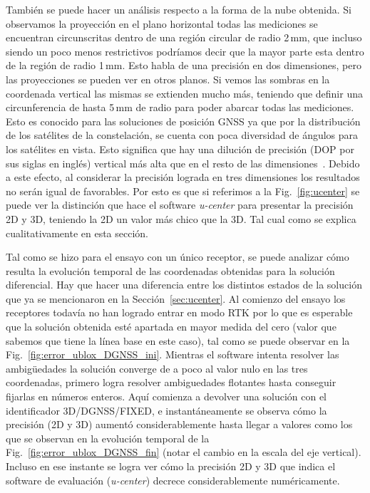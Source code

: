 \documentclass[a4paper,12pt,oneside,onecolumn,final,openright]{book}%
\begin{document}
	También se puede hacer un análisis respecto a la forma de la nube obtenida. Si observamos la proyección en el plano horizontal todas las mediciones se encuentran circunscritas dentro de una región circular de radio 2\,mm, que incluso siendo un poco menos restrictivos podríamos decir que la mayor parte esta dentro de la región de radio 1\,mm. Esto habla de una precisión en dos dimensiones, pero las proyecciones se pueden ver en otros planos. Si vemos las sombras en la coordenada vertical las mismas se extienden mucho más, teniendo que definir una circunferencia de hasta 5\,mm de radio para poder abarcar todas las mediciones. Esto es conocido para las soluciones de posición GNSS ya que por la distribución de los satélites de la constelación, se cuenta con poca diversidad de ángulos para los satélites en vista. Esto significa que hay una dilución de precisión (DOP por sus siglas en inglés) vertical más alta que en el resto de las dimensiones~\cite{kaplan}. Debido a este efecto, al considerar la precisión lograda en tres dimensiones los resultados no serán igual de favorables. Por esto es que si referimos a la Fig.~\ref{fig:ucenter} se puede ver la distinción que hace el software \textit{u-center} para presentar la precisión 2D y 3D, teniendo la 2D un valor más chico que la 3D. Tal cual como se explica cualitativamente en esta sección.

	Tal como se hizo para el ensayo con un único receptor, se puede analizar cómo resulta la evolución temporal de las coordenadas obtenidas para la solución diferencial. Hay que hacer una diferencia entre los distintos estados de la solución que ya se mencionaron en la Sección~\ref{sec:ucenter}. Al comienzo del ensayo los receptores todavía no han logrado entrar en modo RTK por lo que es esperable que la solución obtenida esté apartada en mayor medida del cero (valor que sabemos que tiene la línea base en este caso), tal como se puede observar en la Fig.~\ref{fig:error_ublox_DGNSS_ini}. Mientras el software intenta resolver las ambigüedades la solución converge de a poco al valor nulo en las tres coordenadas, primero logra resolver ambiguedades flotantes hasta conseguir fijarlas en números enteros. Aquí comienza a devolver una solución con el identificador 3D/DGNSS/FIXED, e instantáneamente se observa cómo la precisión (2D y 3D) aumentó considerablemente hasta llegar a valores como los que se observan en la evolución temporal de la Fig.~\ref{fig:error_ublox_DGNSS_fin} (notar el cambio en la escala del eje vertical). Incluso en ese instante se logra ver cómo la precisión 2D y 3D que indica el software de evaluación (\textit{u-center}) decrece considerablemente numéricamente.
	
\end{document}
